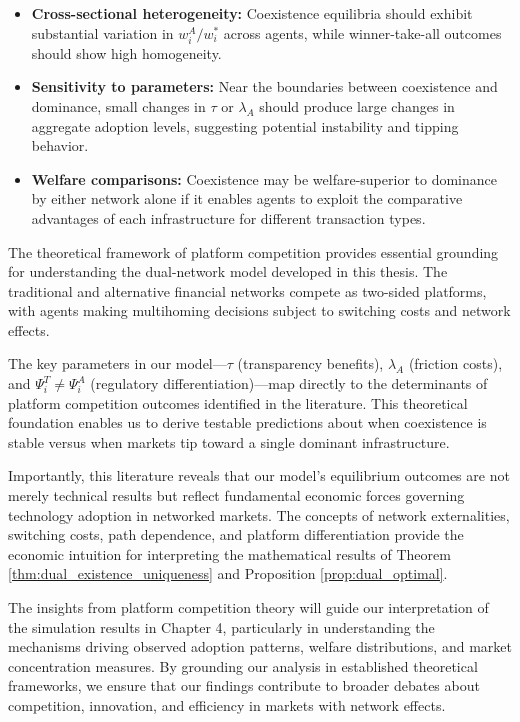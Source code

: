 \begin{itemize}    
    \item \textbf{Cross-sectional heterogeneity:} Coexistence equilibria should exhibit substantial variation in $w_i^A / w_i^*$ across agents, while winner-take-all outcomes should show high homogeneity.
    
    \item \textbf{Sensitivity to parameters:} Near the boundaries between coexistence and dominance, small changes in $\tau$ or $\lambda_A$ should produce large changes in aggregate adoption levels, suggesting potential instability and tipping behavior.
    
    \item \textbf{Welfare comparisons:} Coexistence may be welfare-superior to dominance by either network alone if it enables agents to exploit the comparative advantages of each infrastructure for different transaction types.
\end{itemize}


The theoretical framework of platform competition provides essential grounding for understanding the dual-network model developed in this thesis. The traditional and alternative financial networks compete as two-sided platforms, with agents making multihoming decisions subject to switching costs and network effects.

The key parameters in our model—$\tau$ (transparency benefits), $\lambda_A$ (friction costs), and $\Psi_i^T \neq \Psi_i^A$ (regulatory differentiation)—map directly to the determinants of platform competition outcomes identified in the literature. This theoretical foundation enables us to derive testable predictions about when coexistence is stable versus when markets tip toward a single dominant infrastructure.

Importantly, this literature reveals that our model's equilibrium outcomes are not merely technical results but reflect fundamental economic forces governing technology adoption in networked markets. The concepts of network externalities, switching costs, path dependence, and platform differentiation provide the economic intuition for interpreting the mathematical results of Theorem \ref{thm:dual_existence_uniqueness} and Proposition \ref{prop:dual_optimal}.

The insights from platform competition theory will guide our interpretation of the simulation results in Chapter 4, particularly in understanding the mechanisms driving observed adoption patterns, welfare distributions, and market concentration measures. By grounding our analysis in established theoretical frameworks, we ensure that our findings contribute to broader debates about competition, innovation, and efficiency in markets with network effects.

